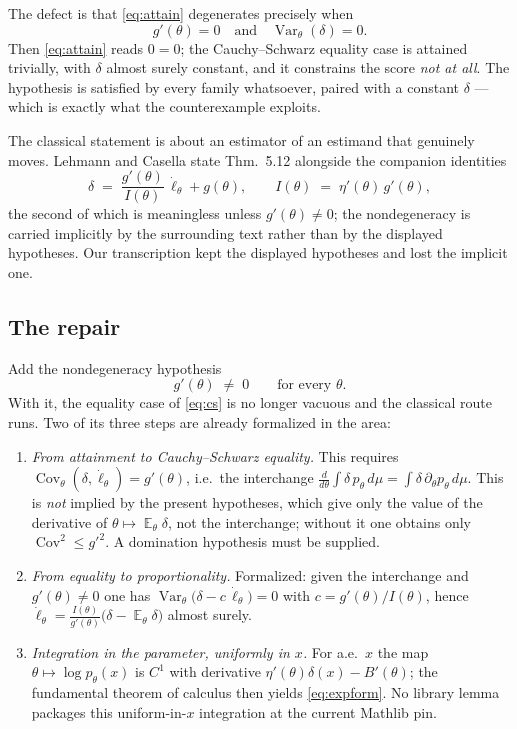 \documentclass[11pt]{article}
\theoremstyle{plain}
\theoremstyle{definition}
\theoremstyle{remark}
\DeclareMathOperator{\Var}{Var}
\DeclareMathOperator{\Cov}{Cov}
\DeclareMathOperator{\E}{\mathbb{E}}
\newcommand{\score}{\dot\ell_\theta}
\begin{document}
The defect is that \eqref{eq:attain} degenerates precisely when
\[
  g'(\theta)=0 \quad\text{and}\quad \Var_\theta(\delta)=0 .
\]
Then \eqref{eq:attain} reads $0=0$; the Cauchy--Schwarz equality case is attained
trivially, with $\delta$ almost surely constant, and it constrains the score \emph{not at
all}. The hypothesis is satisfied by every family whatsoever, paired with a constant
$\delta$ --- which is exactly what the counterexample exploits.

The classical statement is about an estimator of an estimand that genuinely moves. Lehmann
and Casella state Thm.~5.12 alongside the companion identities
\[
  \delta \;=\; \frac{g'(\theta)}{I(\theta)}\,\score + g(\theta),
  \qquad
  I(\theta) \;=\; \eta'(\theta)\,g'(\theta),
\]
the second of which is meaningless unless $g'(\theta)\neq 0$; the nondegeneracy is carried
implicitly by the surrounding text rather than by the displayed hypotheses. Our
transcription kept the displayed hypotheses and lost the implicit one.

\subsection{The repair}

Add the nondegeneracy hypothesis
\[
  g'(\theta) \;\neq\; 0 \qquad\text{for every }\theta .
\]
With it, the equality case of \eqref{eq:cs} is no longer vacuous and the classical route
runs. Two of its three steps are already formalized in the area:

\begin{enumerate}
\item \emph{From attainment to Cauchy--Schwarz equality.} This requires
  $\Cov_\theta(\delta,\score)=g'(\theta)$, i.e.\ the interchange
  $\frac{d}{d\theta}\int \delta\,p_\theta \,d\mu = \int \delta\,\partial_\theta p_\theta\,d\mu$.
  This is \emph{not} implied by the present hypotheses, which give only the value of the
  derivative of $\theta\mapsto\E_\theta\delta$, not the interchange; without it one obtains
  only $\Cov^2\le g'^2$. A domination hypothesis must be supplied.
\item \emph{From equality to proportionality.} Formalized: given the interchange and
  $g'(\theta)\ne 0$ one has $\Var_\theta\bigl(\delta - c\,\score\bigr)=0$ with
  $c=g'(\theta)/I(\theta)$, hence
  $\score = \frac{I(\theta)}{g'(\theta)}\bigl(\delta-\E_\theta\delta\bigr)$ almost surely.
\item \emph{Integration in the parameter, uniformly in $x$.} For a.e.\ $x$ the map
  $\theta\mapsto\log p_\theta(x)$ is $C^1$ with derivative $\eta'(\theta)\delta(x)-B'(\theta)$;
  the fundamental theorem of calculus then yields \eqref{eq:expform}. No library lemma
  packages this uniform-in-$x$ integration at the current Mathlib pin.
\end{enumerate}
\end{document}
